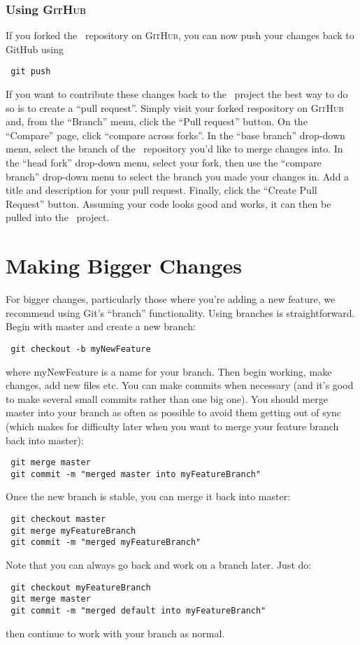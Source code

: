 \subsubsection{Using {\normalfont \scshape GitHub}}

If you forked the \glc\ repository on {\normalfont \scshape GitHub}, you can now push your changes back to {\normalfont \ttfamily GitHub} using
\begin{verbatim}
 git push
\end{verbatim}
If you want to contribute these changes back to the \glc\ project the best way to do so is to create a ``pull request''. Simply visit your forked respository on {\normalfont \scshape GitHub} and, from the ``Branch'' menu, click the ``Pull request'' button. On the ``Compare'' page, click ``compare across forks''. In the ``base branch'' drop-down menu, select the branch of the \glc\ repository you'd like to merge changes into. In the ``head fork'' drop-down menu, select your fork, then use the ``compare branch'' drop-down menu to select the branch you made your changes in. Add a title and description for your pull request. Finally, click the ``Create Pull Request'' button. Assuming your code looks good and works, it can then be pulled into the \glc\ project.

\section{Making Bigger Changes}

For bigger changes, particularly those where you're adding a new feature, we recommend using Git's ``branch'' functionality. Using branches is straightforward. Begin with {\normalfont \ttfamily master} and create a new branch:
\begin{verbatim}
 git checkout -b myNewFeature
\end{verbatim}
where {\normalfont \ttfamily myNewFeature} is a name for your branch. Then begin working, make changes, add new files etc. You can make commits when necessary (and it's good to make several small commits rather than one big one). You should merge {\normalfont \ttfamily master} into your branch as often as possible to avoid them getting out of sync (which makes for difficulty later when you want to merge your feature branch back into {\normalfont \ttfamily master}):
\begin{verbatim}
 git merge master
 git commit -m "merged master into myFeatureBranch"
\end{verbatim}
Once the new branch is stable, you can merge it back into {\normalfont \ttfamily master}:
\begin{verbatim}
 git checkout master
 git merge myFeatureBranch
 git commit -m "merged myFeatureBranch"
\end{verbatim}
Note that you can always go back and work on a branch later. Just do:
\begin{verbatim}
 git checkout myFeatureBranch
 git merge master
 git commit -m "merged default into myFeatureBranch"
\end{verbatim}
then continue to work with your branch as normal.

